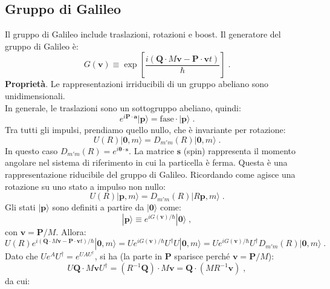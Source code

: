 \documentclass[10pt,a4paper]{report}
\theoremstyle{definition}
\numberwithin{equation}{section}
\newcommand{\ket}{\rangle}
\newcommand{\adj}[1]{#1^{\dagger}}
\begin{document}
\subsection{Gruppo di Galileo}
Il gruppo di Galileo include traslazioni, rotazioni e boost. Il generatore del gruppo di Galileo è:
\begin{equation}
G(\mathbf{v})\equiv\exp\left[\frac{i(\mathbf{Q}\cdot M\mathbf{v}-\mathbf{P}\cdot\mathbf{v}t)}{\hbar}\right]\;.
\end{equation}
\textbf{Proprietà}. Le rappresentazioni irriducibili di un gruppo abeliano sono unidimensionali. \\
In generale, le traslazioni sono un sottogruppo abeliano, quindi:
\begin{equation}
e^{i\mathbf{P}\cdot\mathbf{a}}|\mathbf{p}\ket=\mathrm{fase}\cdot|\mathbf{p}\ket\;.
\end{equation}
Tra tutti gli impulsi, prendiamo quello nullo, che è invariante per rotazione:
\begin{equation}
U(R)|\mathbf{0},m\ket=D_{m'm}(R)|\mathbf{0},m\ket\;.
\end{equation}
In questo caso $D_{m'm}(R)=e^{i\boldsymbol{\theta}\cdot \mathbf{s}}$. La matrice $\mathbf{s}$ (spin) rappresenta il momento angolare nel sistema di riferimento in cui la particella è ferma. Questa è una rappresentazione riducibile del gruppo di Galileo. Ricordando come agisce una rotazione su uno stato a impulso non nullo:
\begin{equation}
U(R)|\mathbf{p},m\ket=D_{m'm}(R)|R\mathbf{p},m\ket\;.
\end{equation}
Gli stati $|\mathbf{p}\ket$ sono definiti a partire da $|\mathbf{0}\ket$ come:
\begin{equation}
|\mathbf{p}\ket\equiv e^{iG(\mathbf{v})/\hbar}|\mathbf{0}\ket\;,
\end{equation}
con $\mathbf{v}=\mathbf{P}/M$. Allora:
\begin{equation}
U(R)e^{i(\mathbf{Q}\cdot M\mathbf{v}-\mathbf{P}\cdot\mathbf{v}t)/\hbar}|\mathbf{0},m\ket= Ue^{iG(\mathbf{v})/\hbar}\adj{U}U|\mathbf{0},m\ket=Ue^{iG(\mathbf{v})/\hbar}\adj{U}D_{m'm}(R)|\mathbf{0},m\ket\;.
\end{equation}
Dato che $Ue^A\adj{U}=e^{UA\adj{U}}$, si ha (la parte in $\mathbf{P}$ sparisce perché $\mathbf{v}=\mathbf{P}/M$):
\begin{equation}
U\mathbf{Q}\cdot M\mathbf{v}\adj{U}=(R^{-1}\mathbf{Q})\cdot M\mathbf{v}=\mathbf{Q}\cdot (MR^{-1}\mathbf{v})\;,
\end{equation}
da cui:
\end{document}
